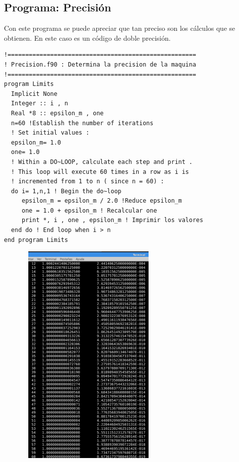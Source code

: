 \documentclass[12pt]{article}
\begin{document}
\subsection{Programa: Precisión}
Con este programa se puede apreciar que tan preciso son los cálculos que se obtienen. En este caso es un código de doble precisión.
\begin{verbatim}
!=====================================================
! Precision.f90 : Determina la precision de la maquina
!=====================================================
program Limits
  Implicit None
  Integer :: i , n
  Real *8 :: epsilon_m , one
  n=60 !Establish the number of iterations 
  ! Set initial values : 
  epsilon_m= 1.0
  one= 1.0
  ! Within a DO~LOOP, calculate each step and print .
  ! This loop will execute 60 times in a row as i is
  ! incremented from 1 to n ( since n = 60) : 
  do i= 1,n,1 ! Begin the do~loop
     epsilon_m = epsilon_m / 2.0 !Reduce epsilon_m
     one = 1.0 + epsilon_m ! Recalcular one
     print *, i , one , epsilon_m ! Imprimir los valores
  end do ! End loop when i > n
end program Limits
\end{verbatim}

\begin{center}
\includegraphics[width=9cm, height =11cm]{Precision}
\end{center}
\pagebreak	
\end{document}
